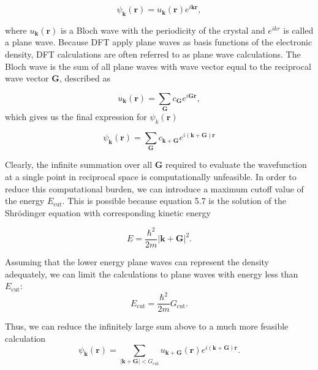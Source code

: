 \begin{equation}
\psi_{\boldsymbol{k}}(\boldsymbol{r}) = u_{\boldsymbol{k}}(\boldsymbol{r})e^{i\boldsymbol{k}\boldsymbol{r}},    
\end{equation}

where $u_{\boldsymbol{k}}(\boldsymbol{r})$ is a Bloch wave with the periodicity of the crystal and $e^{ikr}$ is called a plane wave. Because DFT apply plane waves as basis functions of the electronic density, DFT calculations are often referred to as plane wave calculations. The Bloch wave is the sum of all plane waves with wave vector equal to the reciprocal wave vector $\boldsymbol{G}$, described as 

\begin{equation}
    u_{\boldsymbol{k}}(\boldsymbol{r}) = \sum_{\boldsymbol{G}} c_{\boldsymbol{G}}e^{i\boldsymbol{G}\boldsymbol{r}},
\end{equation}
 which gives us the final expression for $\psi_k (\boldsymbol{r})$ 
 
\begin{equation}
    \psi_{\boldsymbol{k}}(\boldsymbol{r}) = \sum_{\boldsymbol{G}} c_{\boldsymbol{k} + \boldsymbol{G}}e^{i(\boldsymbol{k} + \boldsymbol{G})\boldsymbol{r}}
\end{equation}

Clearly, the infinite summation over all $\boldsymbol{G}$ required to evaluate the wavefunction at a single point in reciprocal space is computationally unfeasible. In order to reduce this computational burden, we can introduce a maximum cutoff value of the energy $E_{\text{cut}}$. This is possible because equation 5.7 is the solution of the Shr\"{o}dinger equation with corresponding kinetic energy 

\begin{equation}
    E = \frac{\hbar^2}{2m}|\boldsymbol{k} + \boldsymbol{G}|^2.
\end{equation}

Assuming that the lower energy plane waves can represent the density adequately, we can limit the calculations to plane waves with energy less than $E_{\text{cut}}$:
\begin{equation}
    E_{\text{cut}} = \frac{\hbar^2}{2m}G_{\text{cut}}.
\end{equation}

Thus, we can reduce the infinitely large sum above to a much more feasible calculation
\begin{equation}
    \psi_{\boldsymbol{k}}(\boldsymbol{r}) = \sum_{|\boldsymbol{k} + \boldsymbol{G}| < G_{\text{cut}}} u_{\boldsymbol{k} + \boldsymbol{G}}(\boldsymbol{r})e^{i(\boldsymbol{k} + \boldsymbol{G})\boldsymbol{r}}.
\end{equation}

